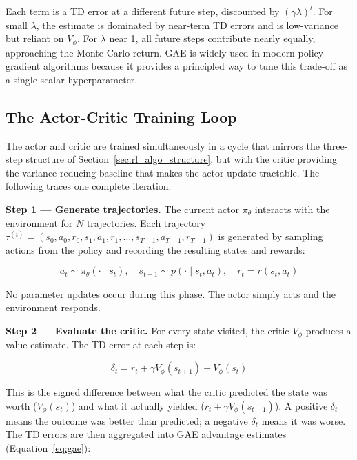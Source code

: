 \documentclass{book}
\begin{document}
Each term is a TD error at a different future step, discounted by
$(\gamma\lambda)^l$. For small $\lambda$, the estimate is dominated by
near-term TD errors and is low-variance but reliant on $V_\phi$. For
$\lambda$ near 1, all future steps contribute nearly equally, approaching
the Monte Carlo return. GAE is widely used in modern policy gradient
algorithms because it provides a principled way to tune this trade-off as
a single scalar hyperparameter.

\subsection{The Actor-Critic Training Loop}
\label{sec:ac_training_loop}

The actor and critic are trained simultaneously in a cycle that mirrors
the three-step structure of Section~\ref{sec:rl_algo_structure}, but with
the critic providing the variance-reducing baseline that makes the actor
update tractable. The following traces one complete iteration.

\textbf{Step 1 --- Generate trajectories.} The current actor $\pi_\theta$
interacts with the environment for $N$ trajectories. Each trajectory
$\tau^{(i)} = (s_0, a_0, r_0, s_1, a_1, r_1, \ldots, s_{T-1}, a_{T-1},
r_{T-1})$ is generated by sampling actions from the policy and recording
the resulting states and rewards:

\begin{equation}
\label{eq:ac_sample}
a_t \sim \pi_\theta(\cdot \mid s_t), \quad
s_{t+1} \sim p(\cdot \mid s_t, a_t), \quad
r_t = r(s_t, a_t)
\end{equation}

No parameter updates occur during this phase. The actor simply acts and
the environment responds.

\textbf{Step 2 --- Evaluate the critic.} For every state visited, the
critic $V_\phi$ produces a value estimate. The TD error at each step is:

\begin{equation}
\label{eq:ac_td_error}
\delta_t = r_t + \gamma V_\phi(s_{t+1}) - V_\phi(s_t)
\end{equation}

This is the signed difference between what the critic predicted the state
was worth ($V_\phi(s_t)$) and what it actually yielded ($r_t + \gamma
V_\phi(s_{t+1})$). A positive $\delta_t$ means the outcome was better than
predicted; a negative $\delta_t$ means it was worse. The TD errors are
then aggregated into GAE advantage estimates (Equation~\ref{eq:gae}):
\end{document}
